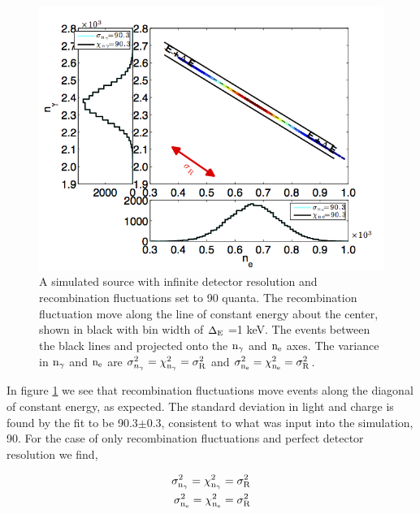 \renewcommand{\baselinestretch}{1}
\small\normalsize
 \begin{figure}[h!]\centering
\includegraphics[width=160mm]{Chapter_Flucs/Figures/Ex_Plots/EX_R_Kr_.png}
\caption{A simulated \KrCal source with infinite detector resolution and recombination fluctuations set to 90 quanta. The recombination fluctuation move along the line of constant energy about the center, shown in black with bin width of $\rm \Delta_E$ =1 keV. The events between the black lines and projected onto the $\rm n_\gamma$ and $\rm n_e$ axes. The variance in $\rm n_\gamma$ and $\rm n_e$ are $\sigma_{n_{\gamma}}^2 = \rm \chi_{n_{\gamma}}^2 = \sigma_{R}^2$ and $\rm \sigma_{n_{e}}^2 = \rm \chi_{n_{e}}^2 = \sigma_{R}^2$.  }
\label{fig:Kr_ex_R}
\end{figure}
\renewcommand{\baselinestretch}{2}
\small\normalsize

\newpage

\noindent In figure \ref{fig:Kr_ex_R} we see that recombination fluctuations move events along the diagonal of constant energy, as expected. The standard deviation in light and charge is found by the fit to be 90.3$\pm$0.3, consistent to what was input into the simulation, 90. For the case of only recombination fluctuations and perfect detector resolution we find, 

\begin{equation}
\begin{split}
\rm \sigma_{n_{\gamma}}^2 = \chi_{n_{\gamma}}^2  = \sigma_{R}^2 \\
\rm  \sigma_{n_{e}}^2 = \chi_{n_{e}}^2 = \sigma_{R}^2
\end{split}
\label{eq:Ex_R_only}
\end{equation}

